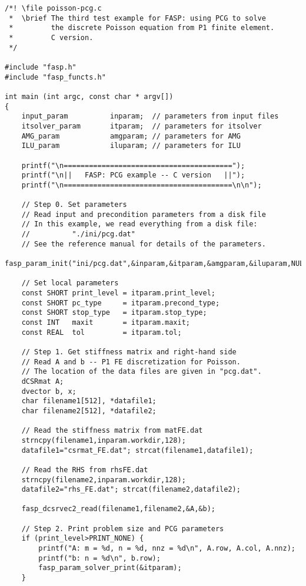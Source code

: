 \documentclass[11pt]{memoir}
\begin{document}
\begin{lstlisting}[stepnumber=1,firstnumber=1]
/*! \file poisson-pcg.c
 *  \brief The third test example for FASP: using PCG to solve 
 *         the discrete Poisson equation from P1 finite element.
 *         C version.
 */

#include "fasp.h"
#include "fasp_functs.h"

int main (int argc, const char * argv[]) 
{
    input_param          inparam;  // parameters from input files
    itsolver_param       itparam;  // parameters for itsolver
    AMG_param            amgparam; // parameters for AMG
    ILU_param            iluparam; // parameters for ILU

    printf("\n========================================");
    printf("\n||   FASP: PCG example -- C version   ||");
    printf("\n========================================\n\n");
    
    // Step 0. Set parameters
    // Read input and precondition parameters from a disk file
    // In this example, we read everything from a disk file:
    //          "./ini/pcg.dat"
    // See the reference manual for details of the parameters. 
    fasp_param_init("ini/pcg.dat",&inparam,&itparam,&amgparam,&iluparam,NULL);

    // Set local parameters
    const SHORT print_level = itparam.print_level;    
    const SHORT pc_type     = itparam.precond_type;
    const SHORT stop_type   = itparam.stop_type;
    const INT   maxit       = itparam.maxit;
    const REAL  tol         = itparam.tol;
    
    // Step 1. Get stiffness matrix and right-hand side
    // Read A and b -- P1 FE discretization for Poisson.
    // The location of the data files are given in "pcg.dat".
    dCSRmat A;
    dvector b, x;
    char filename1[512], *datafile1;
    char filename2[512], *datafile2;

    // Read the stiffness matrix from matFE.dat
    strncpy(filename1,inparam.workdir,128);    
    datafile1="csrmat_FE.dat"; strcat(filename1,datafile1);
    
    // Read the RHS from rhsFE.dat
    strncpy(filename2,inparam.workdir,128);
    datafile2="rhs_FE.dat"; strcat(filename2,datafile2);
    
    fasp_dcsrvec2_read(filename1,filename2,&A,&b);
    
    // Step 2. Print problem size and PCG parameters
    if (print_level>PRINT_NONE) {
        printf("A: m = %d, n = %d, nnz = %d\n", A.row, A.col, A.nnz);
        printf("b: n = %d\n", b.row);
        fasp_param_solver_print(&itparam);
    }
    

\end{lstlisting}
\end{document}
